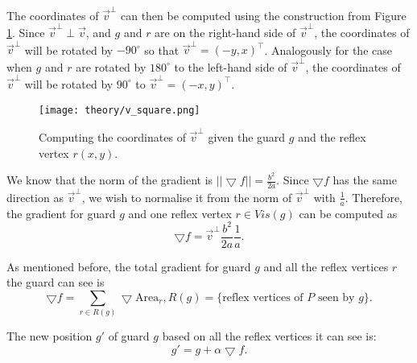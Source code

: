 The coordinates of $\vec v^\perp$ can then be computed using the construction from Figure \ref{fig:vsquare}. Since $\vec v^\perp \perp \vec v$, and $g$ and $r$ are on the right-hand side of $\vec v^\perp$, the coordinates of $\vec v^\perp$ will be rotated by $-90^\circ$ so that $\vec v^\perp = (-y, x)^\intercal$. Analogously for the case when $g$ and $r$ are rotated by $180^\circ$ to the left-hand side of $\vec v^\perp$, the coordinates of $\vec v^\perp$ will be rotated by $90^\circ$ to $\vec v^\perp = (-x, y)^\intercal$.

\begin{figure}[h!]
    \centering
    \texttt{[image: theory/v\_square.png]}
    \caption{Computing the coordinates of $\vec v^\perp$ given the guard $g$ and the reflex vertex $r(x, y)$.}
    \label{fig:vsquare}
\end{figure}

We know that the norm of the gradient is $||\bigtriangledown f|| = \frac{b^2}{2a}$. Since $\bigtriangledown f$ has the same direction as $\vec v^\perp$, we wish to normalise it from the norm of $\vec v^\perp$ with $\frac 1 a$. Therefore, the gradient for guard $g$ and one reflex vertex $r \in Vis(g)$ can be computed as $$\bigtriangledown f = \vec v^\perp \frac{b^2}{2a} \frac 1 a.$$

As mentioned before, the total gradient for guard $g$ and all the reflex vertices $r$ the guard can see is $$\bigtriangledown f = \sum_{r \in R(g)} \bigtriangledown \text{Area}_r, R(g) = \{\text{reflex vertices of } P \text{ seen by }g\}.$$

The new position $g'$ of guard $g$ based on all the reflex vertices it can see is: 
\begin{equation}
    g' = g + \alpha\bigtriangledown f.
    \label{eq:l}
\end{equation}





    

